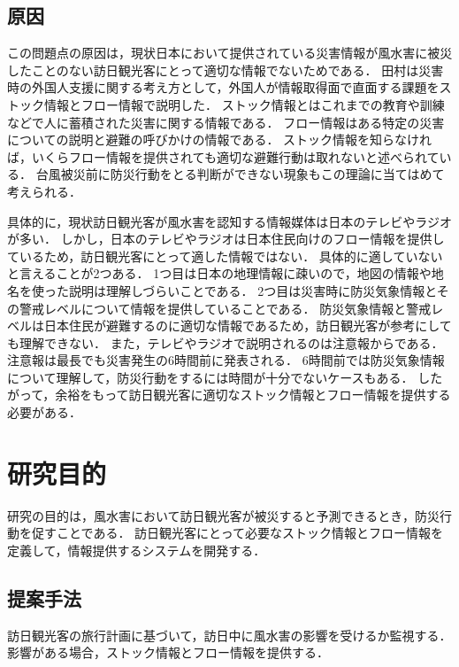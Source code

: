 \documentclass[a4paper,11pt,oneside,openany]{jsbook}
\begin{document}
\subsection{原因}
この問題点の原因は，現状日本において提供されている災害情報が風水害に被災したことのない訪日観光客にとって適切な情報でないためである．
田村\cite{Tamura2017}は災害時の外国人支援に関する考え方として，外国人が情報取得面で直面する課題をストック情報とフロー情報で説明した．
ストック情報とはこれまでの教育や訓練などで人に蓄積された災害に関する情報である．
フロー情報はある特定の災害についての説明と避難の呼びかけの情報である．
ストック情報を知らなければ，いくらフロー情報を提供されても適切な避難行動は取れないと述べられている．
台風被災前に防災行動をとる判断ができない現象もこの理論に当てはめて考えられる．

具体的に，現状訪日観光客が風水害を認知する情報媒体は日本のテレビやラジオが多い．\cite{Typhoon}
しかし，日本のテレビやラジオは日本住民向けのフロー情報を提供しているため，訪日観光客にとって適した情報ではない．
具体的に適していないと言えることが2つある．
1つ目は日本の地理情報に疎いので，地図の情報や地名を使った説明は理解しづらいことである．
2つ目は災害時に防災気象情報とその警戒レベルについて情報を提供していることである．
防災気象情報と警戒レベルは日本住民が避難するのに適切な情報であるため，訪日観光客が参考にしても理解できない．
また，テレビやラジオで説明されるのは注意報からである．注意報は最長でも災害発生の6時間前に発表される．
6時間前では防災気象情報について理解して，防災行動をするには時間が十分でないケースもある．
したがって，余裕をもって訪日観光客に適切なストック情報とフロー情報を提供する必要がある．

\section{研究目的}
研究の目的は，風水害において訪日観光客が被災すると予測できるとき，防災行動を促すことである．
訪日観光客にとって必要なストック情報とフロー情報を定義して，情報提供するシステムを開発する．

\subsection{提案手法}
訪日観光客の旅行計画に基づいて，訪日中に風水害の影響を受けるか監視する．
影響がある場合，ストック情報とフロー情報を提供する．
\end{document}
